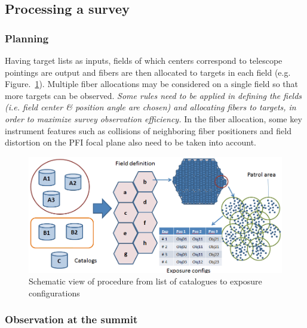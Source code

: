\documentclass[a4paper,notitlepage]{article}
\begin{document}
\subsection{Processing a survey}

\subsubsection{Planning}

Having target lists as inputs, fields of which centers correspond to
telescope pointings are output and fibers are then allocated to targets
in each field
(e.g. Figure.~\ref{fig:sciops-scireq-slide-svyexp}). Multiple fiber
allocations may be considered on a single field so that more targets can
be observed. {\it Some rules need to be applied in defining the fields
(i.e. field center \& position angle are chosen) and allocating fibers
to targets, in order to maximize survey observation efficiency.}  In the
fiber allocation, some key instrument features such as collisions of
neighboring fiber positioners and field distortion on the PFI focal
plane also need to be taken into account.

\begin{figure}[htb]
  \begin{center}
    \includegraphics[width=.75\linewidth]{sciops-scireq-slide-svyexp.png}
  \end{center}
  \caption{Schematic view of procedure from list of catalogues to exposure 
    configurations}
  \label{fig:sciops-scireq-slide-svyexp}
\end{figure}

\subsubsection{Observation at the summit}
\end{document}
